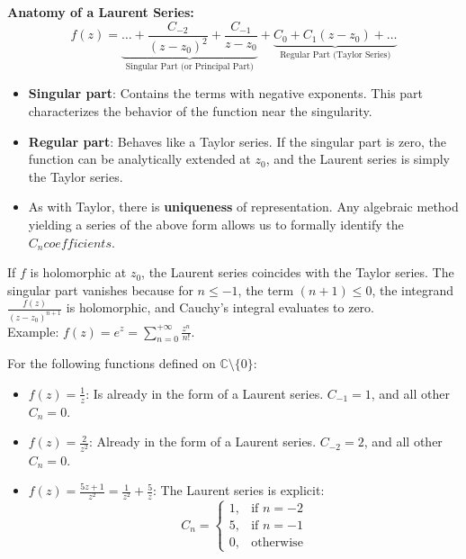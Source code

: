 \textbf{Anatomy of a Laurent Series:}
$$f(z) = \underbrace{\dots + \frac{C_{-2}}{(z - z_0)^2} + \frac{C_{-1}}{z - z_0}}_{\text{Singular Part (or Principal Part)}} + \underbrace{C_0 + C_1(z - z_0) + \dots}_{\text{Regular Part (Taylor Series)}}$$

\begin{itemize}
    \item \textbf{Singular part}: Contains the terms with negative exponents. This part characterizes the behavior of the function near the singularity.
    \item \textbf{Regular part}: Behaves like a Taylor series. If the singular part is zero, the function can be analytically extended at $z_0$, and the Laurent series is simply the Taylor series.
    \item As with Taylor, there is \textbf{uniqueness} of representation. Any algebraic method yielding a series of the above form allows us to formally identify the $C_n coefficients$.
\end{itemize}

\begin{example}
If $f$ is holomorphic at $z_0$, the Laurent series coincides with the Taylor series. The singular part vanishes because for $n \le -1$, the term $(n+1) \le 0$, the integrand $\frac{f(z)}{(z - z_0)^{n+1}}$ is holomorphic, and Cauchy's integral evaluates to zero. \\
Example: $f(z) = e^z = \sum_{n=0}^{+\infty} \frac{z^n}{n!}$.
\end{example}

\begin{example}[Example 2: Laurent Series Centered at $z_0 = 0$]
For the following functions defined on $\mathbb{C} \setminus \{0\}$:
\begin{itemize}
    \item $f(z) = \frac{1}{z}$: Is already in the form of a Laurent series. $C_{-1} = 1$, and all other $C_n = 0$.
    \item $f(z) = \frac{2}{z^2}$: Already in the form of a Laurent series. $C_{-2} = 2$, and all other $C_n = 0$.
    \item $f(z) = \frac{5z + 1}{z^2} = \frac{1}{z^2} + \frac{5}{z}$: The Laurent series is explicit:
    $$C_n = \begin{cases} 1, & \text{if } n = -2 \\ 5, & \text{if } n = -1 \\ 0, & \text{otherwise} \end{cases}$$
\end{itemize}
\end{example}